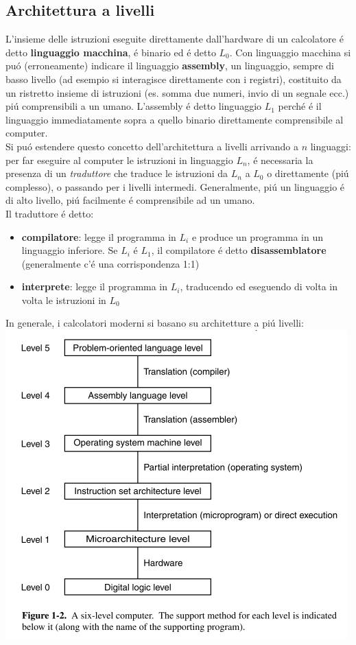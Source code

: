 \documentclass{article}
\begin{document}
\subsection{Architettura a livelli}
L'insieme delle istruzioni eseguite direttamente dall'hardware di un calcolatore é detto \textbf{linguaggio macchina}, é binario ed é detto $L_0$. Con linguaggio macchina si puó (erroneamente) indicare il linguaggio \textbf{assembly}, un linguaggio, sempre di basso livello (ad esempio si interagisce direttamente con i registri), costituito da un ristretto insieme di istruzioni (es. somma due numeri, invio di un segnale ecc.) piú comprensibili a un umano. L'assembly é detto linguaggio $L_1$ perché é il linguaggio immediatamente sopra a quello binario direttamente comprensibile al computer.\\
Si puó estendere questo concetto dell'architettura a livelli arrivando a $n$ linguaggi: per far eseguire al computer le istruzioni in linguaggio $L_n$, é necessaria la presenza di un  \textit{traduttore} che traduce le istruzioni da $L_n$ a $L_0$ o direttamente (piú complesso), o passando per i livelli intermedi. Generalmente, piú un linguaggio é di alto livello, piú facilmente é comprensibile ad un umano.\\
Il traduttore é detto:
\begin{itemize}
	\item \textbf{compilatore}: legge il programma in $L_i$ e produce un programma in un linguaggio inferiore. Se $L_i$ é $L_1$, il compilatore é detto \textbf{disassemblatore} (generalmente c'é una corrispondenza 1:1)
	\item \textbf{interprete}: legge il programma in $L_i$, traducendo ed eseguendo di volta in volta le istruzioni in $L_0$
\end{itemize}
In generale, i calcolatori moderni si basano su architetture a piú livelli:\\
\includegraphics[scale=0.5]{levels-architecture-computer.png}
\end{document}
